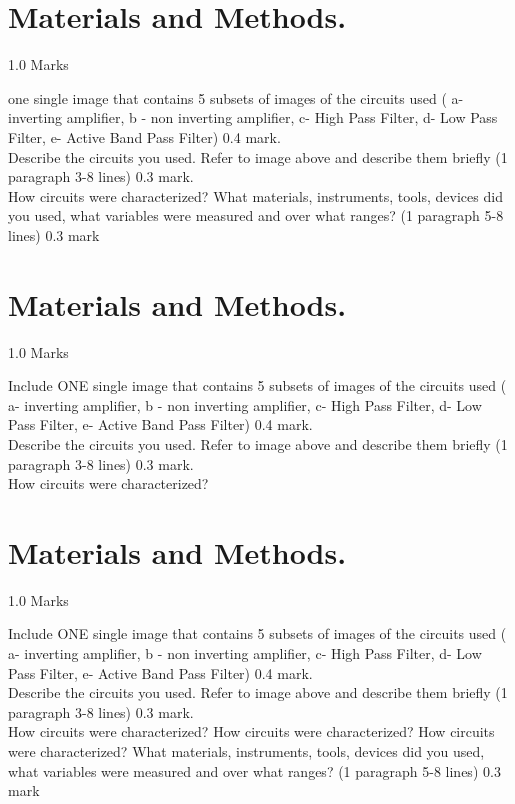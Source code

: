 \documentclass[journal]{IEEEtran}
\begin{document}
\section{Materials and Methods. }
\begin{flushright} 1.0 Marks \end{flushright}
 one single image that contains 5 subsets of images of the circuits used ( a- inverting amplifier, b - non inverting amplifier, c- High Pass Filter, d- Low Pass Filter, e- Active Band Pass Filter) 0.4 mark.\\[0.1in]
Describe the circuits you used. Refer to image above and describe them briefly (1 paragraph 3-8 lines) 0.3 mark.\\[0.1in]
How circuits were characterized?  What materials, instruments, tools, devices did you used, what variables were measured and over what ranges? (1 paragraph 5-8 lines) 0.3 mark\\

\section{Materials and Methods. }
\begin{flushright} 1.0 Marks \end{flushright}
Include ONE single image that contains 5 subsets of images of the circuits used ( a- inverting amplifier, b - non inverting amplifier, c- High Pass Filter, d- Low Pass Filter, e- Active Band Pass Filter) 0.4 mark.\\[0.1in]
Describe the circuits you used. Refer to image above and describe them briefly (1 paragraph 3-8 lines) 0.3 mark.\\[0.1in]
How circuits were characterized?




\section{Materials and Methods. }
\begin{flushright} 1.0 Marks \end{flushright}
Include ONE single image that contains 5 subsets of images of the circuits used ( a- inverting amplifier, b - non inverting amplifier, c- High Pass Filter, d- Low Pass Filter, e- Active Band Pass Filter) 0.4 mark.\\[0.1in]
Describe the circuits you used. Refer to image above and describe them briefly (1 paragraph 3-8 lines) 0.3 mark.\\[0.1in]
How circuits were characterized? How circuits were characterized? How circuits were characterized? What materials, instruments, tools, devices did you used, what variables were measured and over what ranges? (1 paragraph 5-8 lines) 0.3 mark\\
\end{document}
